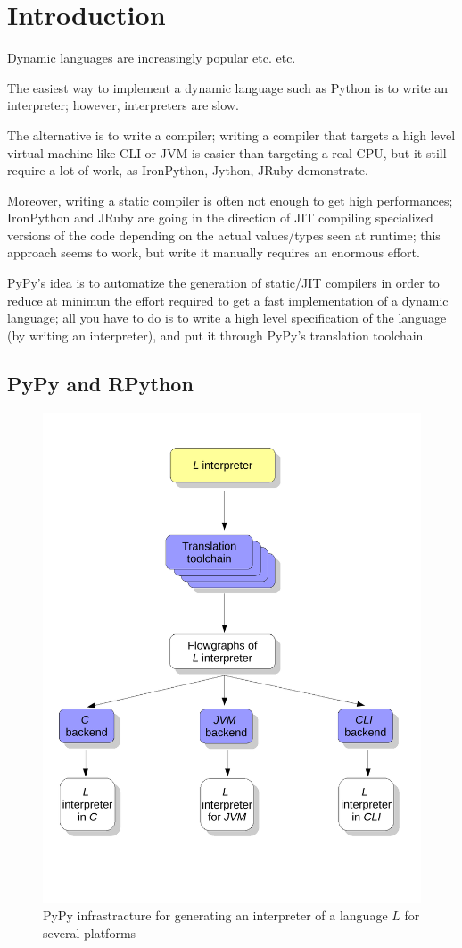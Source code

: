 \section{Introduction}

Dynamic languages are increasingly popular etc. etc.

The easiest way to implement a dynamic language such as Python is to write an
interpreter; however, interpreters are slow.

The alternative is to write a compiler; writing a compiler that targets a high
level virtual machine like CLI or JVM is easier than targeting a real CPU, but
it still require a lot of work, as IronPython, Jython, JRuby demonstrate.

Moreover, writing a static compiler is often not enough to get high
performances; IronPython and JRuby are going in the direction of JIT compiling
specialized versions of the code depending on the actual values/types seen at
runtime; this approach seems to work, but write it manually requires an
enormous effort.

PyPy's idea is to automatize the generation of static/JIT compilers in order
to reduce at minimun the effort required to get a fast implementation of a
dynamic language; all you have to do is to write a high level specification of
the language (by writing an interpreter), and put it through PyPy's
translation toolchain.

\subsection{PyPy and RPython}


\begin{figure}[h]
\begin{center}
\includegraphics[width=.6\textwidth]{diagram0}
\caption{PyPy infrastracture for generating an interpreter of a
  language $L$ for several platforms}\label{pypy-fig}
\end{center}
\end{figure}

